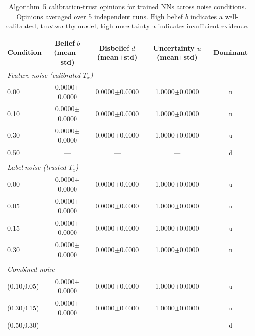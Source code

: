 \begin{table}[ht]
\centering
\caption{Algorithm~5 calibration-trust opinions for trained NNs across noise conditions. Opinions averaged over 5 independent runs. High belief $b$ indicates a well-calibrated, trustworthy model; high uncertainty $u$ indicates insufficient evidence.}
\label{tab:calibration-trust}
\begin{tabular}{lcccc}
\toprule
Condition & Belief $b$ (mean$\pm$std) & Disbelief $d$ (mean$\pm$std) & Uncertainty $u$ (mean$\pm$std) & Dominant \\
\midrule
\multicolumn{5}{l}{\textit{Feature noise (calibrated $T_x$)}} \\
0.00 & 0.0000$\pm$0.0000 & 0.0000$\pm$0.0000 & 1.0000$\pm$0.0000 & u \\
0.10 & 0.0000$\pm$0.0000 & 0.0000$\pm$0.0000 & 1.0000$\pm$0.0000 & u \\
0.30 & 0.0000$\pm$0.0000 & 0.0000$\pm$0.0000 & 1.0000$\pm$0.0000 & u \\
0.50 & — & — & — & d \\
\midrule \\
\multicolumn{5}{l}{\textit{Label noise (trusted $T_x$)}} \\
0.00 & 0.0000$\pm$0.0000 & 0.0000$\pm$0.0000 & 1.0000$\pm$0.0000 & u \\
0.05 & 0.0000$\pm$0.0000 & 0.0000$\pm$0.0000 & 1.0000$\pm$0.0000 & u \\
0.15 & 0.0000$\pm$0.0000 & 0.0000$\pm$0.0000 & 1.0000$\pm$0.0000 & u \\
0.30 & 0.0000$\pm$0.0000 & 0.0000$\pm$0.0000 & 1.0000$\pm$0.0000 & u \\
\midrule \\
\multicolumn{5}{l}{\textit{Combined noise}} \\
(0.10,0.05) & 0.0000$\pm$0.0000 & 0.0000$\pm$0.0000 & 1.0000$\pm$0.0000 & u \\
(0.30,0.15) & 0.0000$\pm$0.0000 & 0.0000$\pm$0.0000 & 1.0000$\pm$0.0000 & u \\
(0.50,0.30) & — & — & — & d \\
\bottomrule
\end{tabular}
\end{table}